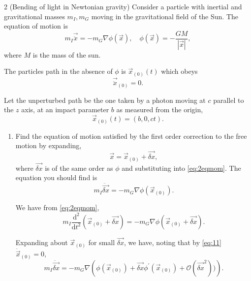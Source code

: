 \documentclass[11pt]{article}
\begin{document}
\begin{problem}{2 (Bending of light in Newtonian gravity)}
	Consider a particle with inertial and gravitational masses \( m_I, m_G \) moving in the gravitational field of the Sun.
	The equation of motion is
	\begin{equation}
		\label{eq:2eqmom}
		m_I \vec{\ddot{x}} = - m_G \nabla \phi(\vec{x}), \quad \phi(\vec{x}) = - \frac{GM}{| \vec{x} |},
	\end{equation}
	where \( M \) is the mass of the sun.

	The particles path in the absence of \(\phi\) is \( \vec{x}_{(0)}(t) \) which obeys
	\begin{equation}
		\label{eq:10}
		\vec{\ddot{x}}_{(0)} = 0.
	\end{equation}

	Let the unperturbed path be the one taken by a photon moving at \( c \) parallel to the \( z \) axis, at an impact parameter \( b \) as measured from the origin,
	\begin{equation}
		\label{eq:11}
		\vec{x}_{(0)}(t) = (b,0, ct).
	\end{equation}

	\begin{enumerate}[label=(\alph*)]
		\item Find the equation of motion satisfied by the first order correction to the free motion by expanding,
		      \begin{equation}
			      \label{eq:12}
			      \vec{x} = \vec{x}_{(0)} + \vec{\delta x},
		      \end{equation}
		      where \( \vec{\delta x} \) is of the same order as \(\phi\) and substituting into \cref{eq:2eqmom}.
		      The equation you should find is
		      \begin{equation}
			      \label{eq:2aeq}
			      m_I \ddot{\vec{\delta x}} = -m_G \nabla \phi(\vec{x}_{(0)}).
		      \end{equation}
		      \begin{answer}
			      We have from \cref{eq:2eqmom},
			      \begin{equation}
				      \label{eq:28}
				      m_I \frac{\mathrm{d}^2}{\mathrm{d} t^2}(\vec{x}_{(0)} + \vec{\delta x}) = -m_G \nabla \phi(\vec{x}_{(0)} + \vec{\delta x}).
			      \end{equation}

			      Expanding about \( \vec{x}_{(0)} \) for small \( \vec{\delta x} \), we have, noting that by \cref{eq:11} \( \ddot{\vec{x}}_{(0)} = 0\),
			      \begin{equation}
				      \label{eq:9}
				      m_I \ddot{\vec{\delta x}} = -m_G \nabla \left( \phi(\vec{x}_{(0)}) + \vec{\delta x} \phi^{\prime}(\vec{x}_{(0)}) + \mathcal{O}(\vec{\delta x}^2)) \right).
			      \end{equation}


\end{answer}
\end{enumerate}
\end{problem}
\end{document}
